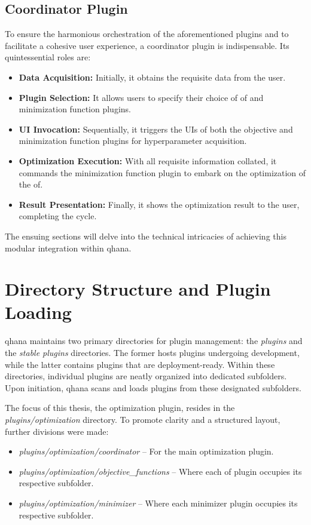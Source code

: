\documentclass[
  a4paper,  %
  twoside,  %
  bibliography=totoc,
  headsepline,
  cleardoublepage=empty,
  parskip=half,
  draft=false
]{scrbook}
\begin{document}
\subsection{Coordinator Plugin}
To ensure the harmonious orchestration of the aforementioned plugins and to facilitate a cohesive user experience, a coordinator plugin is indispensable. Its quintessential roles are:

\begin{itemize}
\item \textbf{Data Acquisition:} Initially, it obtains the requisite data from the user.
\item \textbf{Plugin Selection:} It allows users to specify their choice of \gls{of} and minimization function plugins.
\item \textbf{UI Invocation:} Sequentially, it triggers the UIs of both the objective and minimization function plugins for hyperparameter acquisition.
\item \textbf{Optimization Execution:} With all requisite information collated, it commands the minimization function plugin to embark on the optimization of the \gls{of}.
\item \textbf{Result Presentation:} Finally, it shows the optimization result to the user, completing the cycle.
\end{itemize}

The ensuing sections will delve into the technical intricacies of achieving this modular integration within \gls{qhana}.

\section{Directory Structure and Plugin Loading}
\label{sec:directoryStructure}

\gls{qhana} maintains two primary directories for plugin management: the \textit{plugins} and the \textit{stable plugins} directories.
The former hosts plugins undergoing development, while the latter contains plugins that are deployment-ready.
Within these directories, individual plugins are neatly organized into dedicated subfolders.
Upon initiation, \gls{qhana} scans and loads plugins from these designated subfolders.

The focus of this thesis, the optimization plugin, resides in the \textit{plugins/optimization} directory.
To promote clarity and a structured layout, further divisions were made:

\begin{itemize}
  \item \textit{plugins/optimization/coordinator} – For the main optimization plugin.
  \item \textit{plugins/optimization/objective\_functions} – Where each \gls{of} plugin occupies its respective subfolder.
  \item \textit{plugins/optimization/minimizer} – Where each minimizer plugin occupies its respective subfolder.
\end{itemize}
\end{document}
